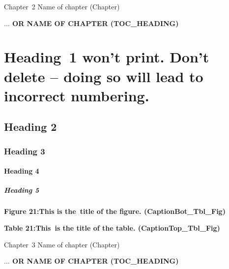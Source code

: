 \documentclass[12pt]{report}
\begin{document}

\newpage

\vspace{\baselineskip}Chapter\ 2  Name of chapter (Chapter)\par

\begin{FlushLeft}
{\fontsize{14pt}{16.8pt}\selectfont \textbf{\uppercase{$ \ldots $ or Name of Chapter (TOC\_HEADING)}}\par}
\end{FlushLeft}\par

\section*{Heading\ 1 won’t print.  Don’t delete – doing so will lead to incorrect numbering.}
\subsection*{Heading 2}
\subsubsection*{Heading 3}
\paragraph*{Heading 4}
\subparagraph*{Heading 5}
\begin{FlushLeft}
\textbf{Figure 21:\tab This is the\ title of the figure.  (CaptionBot\_Tbl\_Fig)}
\end{FlushLeft}\par

\begin{FlushLeft}
\textbf{Table 21:\tab This\ is the title of the table.  (CaptionTop\_Tbl\_Fig)}
\end{FlushLeft}\par




\newpage

\vspace{\baselineskip}Chapter\ 3  Name of chapter (Chapter)\par

\begin{FlushLeft}
{\fontsize{14pt}{16.8pt}\selectfont \textbf{\uppercase{$ \ldots $ or Name of Chapter (TOC\_HEADING)}}\par}
\end{FlushLeft}\par
\end{document}
